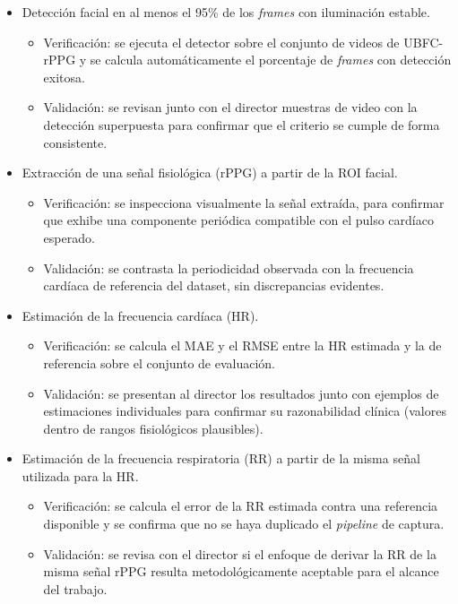 \documentclass[
11pt, %
]{charter}
\begin{document}
	\begin{itemize}
		\item Detección facial en al menos el 95\% de los \textit{frames} con iluminación estable.
		\begin{itemize}
			\item Verificación: se ejecuta el detector sobre el conjunto de videos de UBFC-rPPG y se calcula automáticamente el porcentaje de \textit{frames} con detección exitosa.
			\item Validación: se revisan junto con el director muestras de video con la detección superpuesta para confirmar que el criterio se cumple de forma consistente.
		\end{itemize}
		
		\item Extracción de una señal fisiológica (rPPG) a partir de la ROI facial.
		\begin{itemize}
			\item Verificación: se inspecciona visualmente la señal extraída, para confirmar que exhibe una componente periódica compatible con el pulso cardíaco esperado.
			\item Validación: se contrasta la periodicidad observada con la frecuencia cardíaca de referencia del dataset, sin discrepancias evidentes.
		\end{itemize}
		
		\item Estimación de la frecuencia cardíaca (HR).
		\begin{itemize}
			\item Verificación: se calcula el MAE y el RMSE entre la HR estimada y la de referencia sobre el conjunto de evaluación.
			\item Validación: se presentan al director los resultados junto con ejemplos de estimaciones individuales para confirmar su razonabilidad clínica (valores dentro de rangos fisiológicos plausibles).
		\end{itemize}
		
		\item Estimación de la frecuencia respiratoria (RR) a partir de la misma señal utilizada para la HR.
		\begin{itemize}
			\item Verificación: se calcula el error de la RR estimada contra una referencia disponible y se confirma que no se haya duplicado el \textit{pipeline} de captura.
			\item Validación: se revisa con el director si el enfoque de derivar la RR de la misma señal rPPG resulta metodológicamente aceptable para el alcance del trabajo.
		\end{itemize}
		

\end{itemize}
\end{document}
